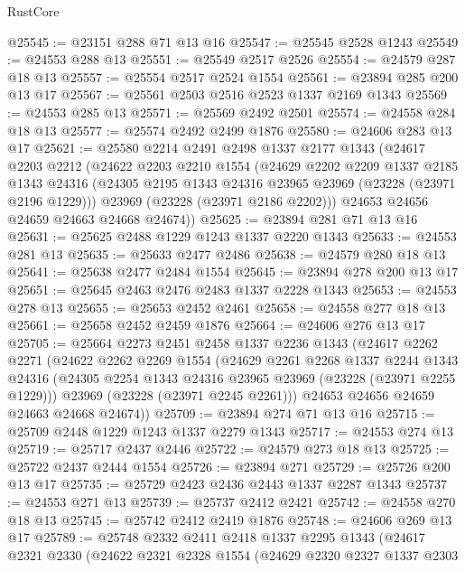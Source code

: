 \begin{lexlean}{RustCore}
\begin{coremodule}
@25545 := @23151 @288 @71 @13 @16
@25547 := @25545 @2528 @1243
@25549 := @24553 @288 @13
@25551 := @25549 @2517 @2526
@25554 := @24579 @287 @18 @13
@25557 := @25554 @2517 @2524 @1554
@25561 := @23894 @285 @200 @13 @17
@25567 := @25561 @2503 @2516 @2523 @1337 @2169 @1343
@25569 := @24553 @285 @13
@25571 := @25569 @2492 @2501
@25574 := @24558 @284 @18 @13
@25577 := @25574 @2492 @2499 @1876
@25580 := @24606 @283 @13 @17
@25621 := @25580
    @2214
    @2491
    @2498
    @1337
    @2177
    @1343
    (@24617
      @2203
      @2212
      (@24622
        @2203
        @2210
        @1554
        (@24629
          @2202
          @2209
          @1337
          @2185
          @1343
          @24316
          (@24305 @2195 @1343 @24316 @23965 @23969 (@23228 (@23971 @2196 @1229)))
          @23969
          (@23228 (@23971 @2186 @2202)))
        @24653
        @24656
        @24659
        @24663
        @24668
        @24674))
@25625 := @23894 @281 @71 @13 @16
@25631 := @25625 @2488 @1229 @1243 @1337 @2220 @1343
@25633 := @24553 @281 @13
@25635 := @25633 @2477 @2486
@25638 := @24579 @280 @18 @13
@25641 := @25638 @2477 @2484 @1554
@25645 := @23894 @278 @200 @13 @17
@25651 := @25645 @2463 @2476 @2483 @1337 @2228 @1343
@25653 := @24553 @278 @13
@25655 := @25653 @2452 @2461
@25658 := @24558 @277 @18 @13
@25661 := @25658 @2452 @2459 @1876
@25664 := @24606 @276 @13 @17
@25705 := @25664
    @2273
    @2451
    @2458
    @1337
    @2236
    @1343
    (@24617
      @2262
      @2271
      (@24622
        @2262
        @2269
        @1554
        (@24629
          @2261
          @2268
          @1337
          @2244
          @1343
          @24316
          (@24305 @2254 @1343 @24316 @23965 @23969 (@23228 (@23971 @2255 @1229)))
          @23969
          (@23228 (@23971 @2245 @2261)))
        @24653
        @24656
        @24659
        @24663
        @24668
        @24674))
@25709 := @23894 @274 @71 @13 @16
@25715 := @25709 @2448 @1229 @1243 @1337 @2279 @1343
@25717 := @24553 @274 @13
@25719 := @25717 @2437 @2446
@25722 := @24579 @273 @18 @13
@25725 := @25722 @2437 @2444 @1554
@25726 := @23894 @271
@25729 := @25726 @200 @13 @17
@25735 := @25729 @2423 @2436 @2443 @1337 @2287 @1343
@25737 := @24553 @271 @13
@25739 := @25737 @2412 @2421
@25742 := @24558 @270 @18 @13
@25745 := @25742 @2412 @2419 @1876
@25748 := @24606 @269 @13 @17
@25789 := @25748
    @2332
    @2411
    @2418
    @1337
    @2295
    @1343
    (@24617
      @2321
      @2330
      (@24622
        @2321
        @2328
        @1554
        (@24629
          @2320
          @2327
          @1337
          @2303

\end{coremodule}
\end{lexlean}
